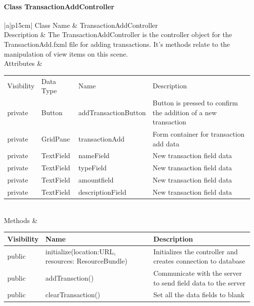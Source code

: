 \documentclass[12pt]{article}
\begin{document}
\paragraph{Class TransactionAddController}
\begin{table}[H]
	\begin{tabular}{|a|p{15cm}|}
		\hline
		{Class Name} & {TransactionAddController} \\
		\hline
		Description & The TransactionAddController is the controller object for the TransactionAdd.fxml file for adding transactions. It's methods relate to the manipulation of view items on this scene.\\
		\hline
		Attributes & 
		\begin{tabular}{| p{1.5cm} | p{2.5cm} | p{4.45cm} | p{5.0cm} |}
			\hline
			\rowcolor{lightgray}
			Visibility & Data Type & Name & Description \\
			\rowcolor{white}
			\hline
			private & Button & addTransactionButton & Button is pressed to confirm the addition of  a new transaction\\
			\hline
			private & GridPane & transactionAdd & Form container for transaction add data\\
			\hline
			private & TextField & nameField & New transaction field data\\
			\hline
			private & TextField & typeField & New transaction field data\\
			\hline
			private & TextField & amountfield & New transaction field data\\
			\hline
			private & TextField & descriptionField & New transaction field data\\
			\hline	
		\end{tabular} \\
		\hline
		Methods & 		 
		\begin{tabular}{| p{1.5cm} | p{6.5cm} | p{5.9cm} |}
			\hline
			\rowcolor{gray}
			{Visibility} &{Name} & {Description} \\
			\hline
			\rowcolor{white}			
			public &  initialize(location:URL, resources: ResourceBundle) & Initializes the controller and creates connection to database\\
			\hline
			public &  addTransction() & Communicate with the server to send field data to the server\\
			\hline
			public &  clearTransaction() & Set all the data fields to blank\\
			\hline			
		\end{tabular}								 
	\end{tabular}
\end{table}
\end{document}
